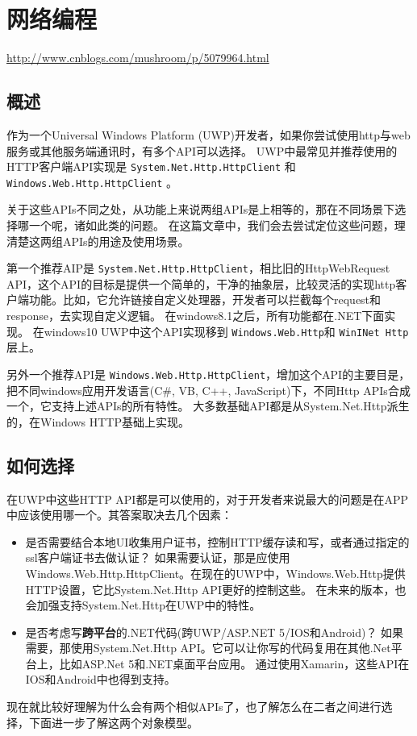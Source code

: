 \documentclass{ctexbook}
\begin{document}
	\chapter{网络编程}
	\url{http://www.cnblogs.com/mushroom/p/5079964.html}
	
	\section{概述}
	作为一个Universal Windows Platform (UWP)开发者，如果你尝试使用http与web服务或其他服务端通讯时，有多个API可以选择。 UWP中最常见并推荐使用的HTTP客户端API实现是 \texttt{System.Net.Http.HttpClient} 和 \texttt{Windows.Web.Http.HttpClient} 。
	
	关于这些APIs不同之处，从功能上来说两组APIs是上相等的，那在不同场景下选择哪一个呢，诸如此类的问题。 在这篇文章中，我们会去尝试定位这些问题，理清楚这两组APIs的用途及使用场景。
	
	第一个推荐AIP是 \texttt{System.Net.Http.HttpClient}，相比旧的HttpWebRequest API，这个API的目标是提供一个简单的，干净的抽象层，比较灵活的实现http客户端功能。比如，它允许链接自定义处理器，开发者可以拦截每个request和response，去实现自定义逻辑。 在windows8.1之后，所有功能都在.NET下面实现。 在windows10 UWP中这个API实现移到 \texttt{Windows.Web.Http}和 \texttt{WinINet Http}层上。
	
	另外一个推荐API是 \texttt{Windows.Web.Http.HttpClient}，增加这个API的主要目是，把不同windows应用开发语言(C\#, VB, C++, JavaScript)下，不同Http APIs合成一个，它支持上述APIs的所有特性。 大多数基础API都是从System.Net.Http派生的，在Windows HTTP基础上实现。
	
	\section{如何选择}
	在UWP中这些HTTP API都是可以使用的，对于开发者来说最大的问题是在APP中应该使用哪一个。其答案取决去几个因素：
	\begin{itemize}
		\item 是否需要结合本地UI收集用户证书，控制HTTP缓存读和写，或者通过指定的ssl客户端证书去做认证？ 如果需要认证，那是应使用Windows.Web.Http.HttpClient。在现在的UWP中，Windows.Web.Http提供HTTP设置，它比System.Net.Http API更好的控制这些。 在未来的版本，也会加强支持System.Net.Http在UWP中的特性。
		\item 是否考虑写\textbf{跨平台}的.NET代码(跨UWP/ASP.NET 5/IOS和Android)？ 如果需要，那使用System.Net.Http API。它可以让你写的代码复用在其他.Net平台上，比如ASP.Net 5和.NET桌面平台应用。 通过使用Xamarin，这些API在IOS和Android中也得到支持。
	\end{itemize}
	现在就比较好理解为什么会有两个相似APIs了，也了解怎么在二者之间进行选择，下面进一步了解这两个对象模型。
	
\end{document}
